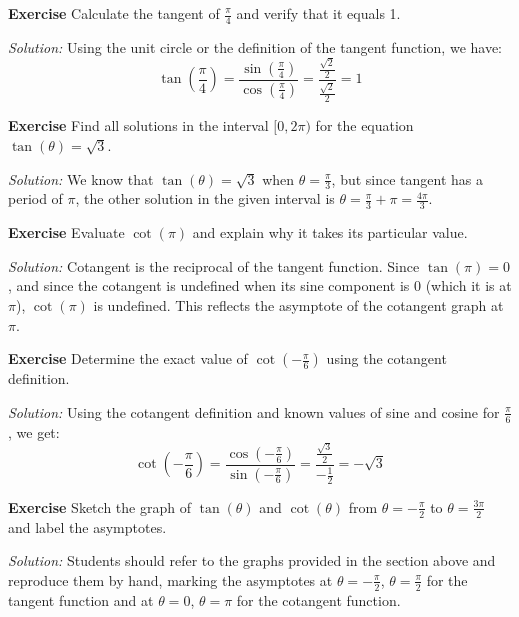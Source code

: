\documentclass[a4paper,12pt]{book}
\newenvironment{exercise}[1][]
  {\par\medskip\noindent\textbf{Exercise #1} \rmfamily}
  {\medskip}
\newenvironment{solution}[1][]
{\par\noindent\textit{Solution:} \rmfamily}{\medskip}
\begin{document}
\begin{exercise}
Calculate the tangent of \(\frac{\pi}{4}\) and verify that it equals 1.
\end{exercise}
\begin{solution}
Using the unit circle or the definition of the tangent function, we have:
\[
\tan\left(\frac{\pi}{4}\right) = \frac{\sin\left(\frac{\pi}{4}\right)}{\cos\left(\frac{\pi}{4}\right)} = \frac{\frac{\sqrt{2}}{2}}{\frac{\sqrt{2}}{2}} = 1
\]
\end{solution}

\begin{exercise}
Find all solutions in the interval \([0, 2\pi)\) for the equation \(\tan(\theta) = \sqrt{3}\).
\end{exercise}
\begin{solution}
We know that \(\tan(\theta) = \sqrt{3}\) when \(\theta = \frac{\pi}{3}\), but since tangent has a period of \(\pi\), the other solution in the given interval is \(\theta = \frac{\pi}{3} + \pi = \frac{4\pi}{3}\).
\end{solution}

\begin{exercise}
Evaluate \(\cot(\pi)\) and explain why it takes its particular value.
\end{exercise}
\begin{solution}
Cotangent is the reciprocal of the tangent function. Since \(\tan(\pi) = 0\), and since the cotangent is undefined when its sine component is 0 (which it is at \(\pi\)), \(\cot(\pi)\) is undefined. This reflects the asymptote of the cotangent graph at \(\pi\).
\end{solution}

\begin{exercise}
Determine the exact value of \(\cot\left(-\frac{\pi}{6}\right)\) using the cotangent definition.
\end{exercise}
\begin{solution}
Using the cotangent definition and known values of sine and cosine for \(\frac{\pi}{6}\), we get:
\[
\cot\left(-\frac{\pi}{6}\right) = \frac{\cos\left(-\frac{\pi}{6}\right)}{\sin\left(-\frac{\pi}{6}\right)} = \frac{\frac{\sqrt{3}}{2}}{-\frac{1}{2}} = -\sqrt{3}
\]
\end{solution}

\begin{exercise}
Sketch the graph of \(\tan(\theta)\) and \(\cot(\theta)\) from \(\theta = -\frac{\pi}{2}\) to \(\theta = \frac{3\pi}{2}\) and label the asymptotes.
\end{exercise}
\begin{solution}
Students should refer to the graphs provided in the section above and reproduce them by hand, marking the asymptotes at \(\theta = -\frac{\pi}{2}\), \(\theta = \frac{\pi}{2}\) for the tangent function and at \(\theta = 0\), \(\theta = \pi\) for the cotangent function.
\end{solution}
\end{document}
